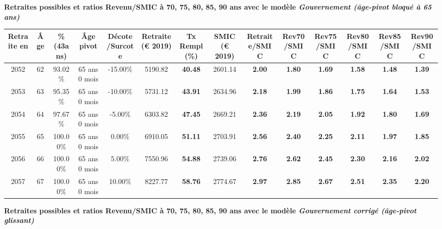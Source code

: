 {\bf \noindent Retraites possibles et ratios Revenu/SMIC à 70, 75, 80, 85, 90 ans avec le modèle \emph{Gouvernement (âge-pivot bloqué à 65 ans)}}  
 
\begin{adjustbox}{max width=\textwidth} 
\begin{tabular}[htb]{|c|c||c|c|c||c|c||c||c|c|c|c|c|c|} 
\hline 
 Retraite en &  Âge &  \%(43ans) &  Âge pivot &  Décote/Surcote &  Retraite (\euro{} 2019) &  Tx Rempl(\%) &  SMIC (\euro{} 2019) &  Retraite/SMIC &  Rev70/SMIC &  Rev75/SMIC &  Rev80/SMIC &  Rev85/SMIC &  Rev90/SMIC \\ 
\hline \hline 
 2052 &  62 &  93.02\% &  65 ans 0 mois &  -15.00\% &  5190.82 &  {\bf 40.48} &  2601.14 &  {\bf 2.00} &  {\bf 1.80} &  {\bf 1.69} &  {\bf 1.58} &  {\bf 1.48} &  {\bf 1.39} \\ 
\hline 
 2053 &  63 &  95.35\% &  65 ans 0 mois &  -10.00\% &  5731.12 &  {\bf 43.91} &  2634.96 &  {\bf 2.18} &  {\bf 1.99} &  {\bf 1.86} &  {\bf 1.75} &  {\bf 1.64} &  {\bf 1.53} \\ 
\hline 
 2054 &  64 &  97.67\% &  65 ans 0 mois &  -5.00\% &  6303.82 &  {\bf 47.45} &  2669.21 &  {\bf 2.36} &  {\bf 2.19} &  {\bf 2.05} &  {\bf 1.92} &  {\bf 1.80} &  {\bf 1.69} \\ 
\hline 
 2055 &  65 &  100.00\% &  65 ans 0 mois &  0.00\% &  6910.05 &  {\bf 51.11} &  2703.91 &  {\bf 2.56} &  {\bf 2.40} &  {\bf 2.25} &  {\bf 2.11} &  {\bf 1.97} &  {\bf 1.85} \\ 
\hline 
 2056 &  66 &  100.00\% &  65 ans 0 mois &  5.00\% &  7550.96 &  {\bf 54.88} &  2739.06 &  {\bf 2.76} &  {\bf 2.62} &  {\bf 2.45} &  {\bf 2.30} &  {\bf 2.16} &  {\bf 2.02} \\ 
\hline 
 2057 &  67 &  100.00\% &  65 ans 0 mois &  10.00\% &  8227.77 &  {\bf 58.76} &  2774.67 &  {\bf 2.97} &  {\bf 2.85} &  {\bf 2.67} &  {\bf 2.51} &  {\bf 2.35} &  {\bf 2.20} \\ 
\hline 
\hline 
\end{tabular} 
\end{adjustbox} 
 
 \vspace{0.1cm} 
{\bf \noindent Retraites possibles et ratios Revenu/SMIC à 70, 75, 80, 85, 90 ans avec le modèle \emph{Gouvernement corrigé (âge-pivot glissant)}}  
 
